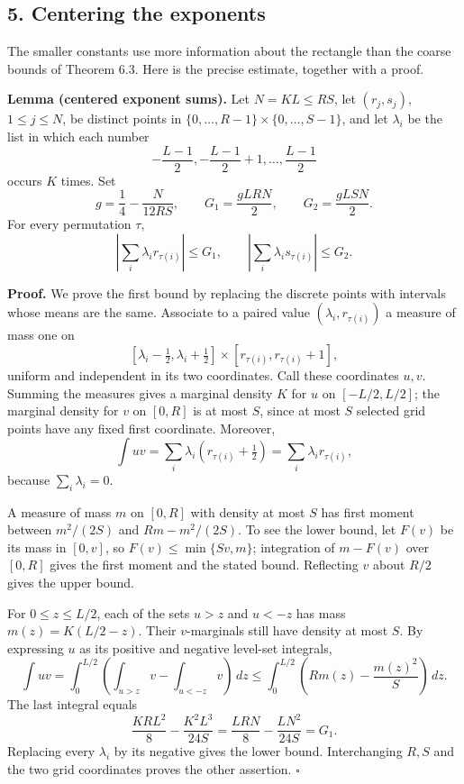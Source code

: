 \documentclass[
  11pt,
  a4paper,
]{article}
\begin{document}
\subsection{5. Centering the exponents}\label{centering-the-exponents}

The smaller constants use more information about the rectangle than the
coarse bounds of Theorem 6.3. Here is the precise estimate, together
with a proof.

\textbf{Lemma (centered exponent sums).} Let \(N=KL\le RS\), let
\((r_j,s_j)\), \(1\le j\le N\), be distinct points in
\(\{0,\ldots,R-1\}\times\{0,\ldots,S-1\}\), and let \(\lambda_i\) be the
list in which each number \[
-\frac{L-1}{2},-\frac{L-1}{2}+1,\ldots,\frac{L-1}{2}
\] occurs \(K\) times. Set \[
g=\frac14-\frac{N}{12RS},\qquad
G_1=\frac{gLRN}{2},\qquad G_2=\frac{gLSN}{2}.
\] For every permutation \(\tau\), \[
\left|\sum_i\lambda_i r_{\tau(i)}\right|\le G_1,\qquad
\left|\sum_i\lambda_i s_{\tau(i)}\right|\le G_2. \tag{7.13}
\]

\textbf{Proof.} We prove the first bound by replacing the discrete
points with intervals whose means are the same. Associate to a paired
value \((\lambda_i,r_{\tau(i)})\) a measure of mass one on \[
[\lambda_i-\tfrac12,\lambda_i+\tfrac12]
\times[r_{\tau(i)},r_{\tau(i)}+1],
\] uniform and independent in its two coordinates. Call these
coordinates \(u,v\). Summing the measures gives a marginal density \(K\)
for \(u\) on \([-L/2,L/2]\); the marginal density for \(v\) on \([0,R]\)
is at most \(S\), since at most \(S\) selected grid points have any
fixed first coordinate. Moreover, \[
\int uv=\sum_i\lambda_i(r_{\tau(i)}+\tfrac12)
=\sum_i\lambda_i r_{\tau(i)},
\] because \(\sum_i\lambda_i=0\).

A measure of mass \(m\) on \([0,R]\) with density at most \(S\) has
first moment between \(m^2/(2S)\) and \(Rm-m^2/(2S)\). To see the lower
bound, let \(F(v)\) be its mass in \([0,v]\), so
\(F(v)\le\min\{Sv,m\}\); integration of \(m-F(v)\) over \([0,R]\) gives
the first moment and the stated bound. Reflecting \(v\) about \(R/2\)
gives the upper bound.

For \(0\le z\le L/2\), each of the sets \(u>z\) and \(u<-z\) has mass
\(m(z)=K(L/2-z)\). Their \(v\)-marginals still have density at most
\(S\). By expressing \(u\) as its positive and negative level-set
integrals, \[
\int uv
=\int_0^{L/2}\left(\int_{u>z}v-\int_{u<-z}v\right)\,dz
\le\int_0^{L/2}\left(Rm(z)-\frac{m(z)^2}{S}\right)\,dz.
\] The last integral equals \[
\frac{KRL^2}{8}-\frac{K^2L^3}{24S}
=\frac{LRN}{8}-\frac{LN^2}{24S}=G_1.
\] Replacing every \(\lambda_i\) by its negative gives the lower bound.
Interchanging \(R,S\) and the two grid coordinates proves the other
assertion. \(\square\)
\end{document}
